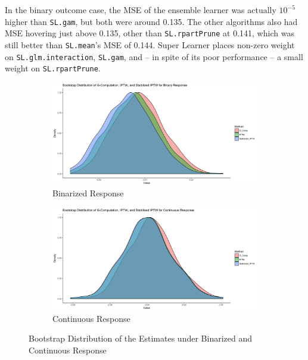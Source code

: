 \documentclass[english, 12pt]{article}
\begin{document}
In the binary outcome case, the MSE of the ensemble learner was actually $10^{-5}$ higher than \texttt{SL.gam}, but both were around 0.135. The other algorithms also had MSE hovering just above 0.135, other than \texttt{SL.rpartPrune} at 0.141, which was still better than \texttt{SL.mean}'s MSE of 0.144. Super Learner places non-zero weight on \texttt{SL.glm.interaction}, \texttt{SL.gam}, and -- in spite of its poor performance -- a small weight on \texttt{SL.rpartPrune}.

\begin{figure}
\centering
\begin{subfigure}{\columnwidth}
\centering
    \includegraphics[scale=0.125]{figures/boot_dens_binary.png}    \caption{Binarized Response}
    \label{fig:boot_bin}
\end{subfigure}
\begin{subfigure}{\columnwidth}
\centering
    \includegraphics[scale=0.125]{figures/boot_dens_continuous.png}
    \caption{Continuous Response}
    \label{fig:boot_cont}
\end{subfigure}
\caption{Bootstrap Distribution of the Estimates under Binarized and Continuous Response}
\label{fig:boot_dist}
\end{figure}
\end{document}
